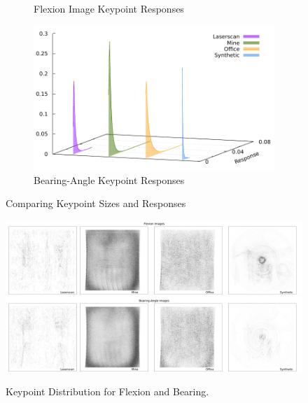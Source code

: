 \begin{figure}[H]
\begin{subfigure}[t]{0.45\linewidth}
    \caption{Flexion Image Keypoint Responses}
\end{subfigure}\quad
\begin{subfigure}[t]{0.45\linewidth}
    \includegraphics[width=\linewidth]{chapter06/results/AKAZE/bearing/response.pdf}
    \caption{Bearing-Angle Keypoint Responses}
\end{subfigure}
    \caption{Comparing Keypoint Sizes and Responses}
\end{figure}
\begin{figure}[H]
    \includegraphics[width=\linewidth]{chapter06/results/AKAZE/flexion/distribution.pdf}\\
    \includegraphics[width=\linewidth]{chapter06/results/AKAZE/bearing/distribution.pdf}%
    \caption{Keypoint Distribution for Flexion and Bearing.}
\end{figure}
